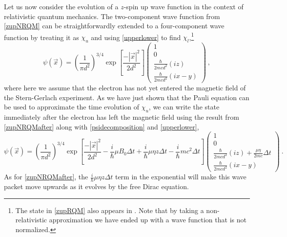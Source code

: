 \documentclass[onecolumn,secnumarabic,amsmath,amssymb,balancelastpage,nofootinbib]{article}
\begin{document}
Let us now consider the evolution of a $z$-spin up wave function in the context of relativistic quantum mechanics.  The two-component wave function from \eqref{zupNRQM} can be straightforwardly extended to a four-component wave function by treating it as $\chi_u$ and using \eqref{upperlower} to find $\chi_l$,\footnote{The state in \eqref{zupRQM} also appears in \citet[eq.\ 36]{howelectronsspin}.  Note that by taking a non-relativistic approximation we have ended up with a wave function that is not normalized.}
\begin{equation}
\psi(\vec{x}) = \left(\frac{1}{\pi d^2}\right)^{3/4}  \exp\left[\frac{-|\vec{x}|^2}{2 d^2}\right] \left(\begin{matrix} 1\\0\\ \frac{\hbar}{2 m c d^2}(i z) \\ \frac{\hbar}{2 m c d^2}(i x-y)\end{matrix}\right)
\ ,
\label{zupRQM}
\end{equation}
where here we assume that the electron has not yet entered the magnetic field of the Stern-Gerlach experiment.  As we have just shown that the Pauli equation can be used to approximate the time evolution of $\chi_u$, we can write the state immediately after the electron has left the magnetic field using the result from \eqref{zupNRQMafter} along with \eqref{psidecomposition} and \eqref{upperlower},
\begin{equation}
\psi(\vec{x}) = \left(\frac{1}{\pi d^2}\right)^{3/4}  \exp\left[\frac{-|\vec{x}|^2}{2 d^2} - \frac{i}{\hbar}\mu B_0 \Delta t + \frac{i}{\hbar}\mu \eta z \Delta t -\frac{i}{\hbar} m c^2 \Delta t\right] \left(\begin{matrix} 1\\0\\ \frac{\hbar}{2 m c d^2}(i z) + \frac{\mu \eta}{2 m c} \Delta t \\ \frac{\hbar}{2 m c d^2}(i x-y) \end{matrix}\right)
\ .
\label{zupRQMafter}
\end{equation}
As for \eqref{zupNRQMafter}, the $\frac{i}{\hbar}\mu \eta z \Delta t$ term in the exponential will make this wave packet move upwards as it evolves by the free Dirac equation.
\end{document}
